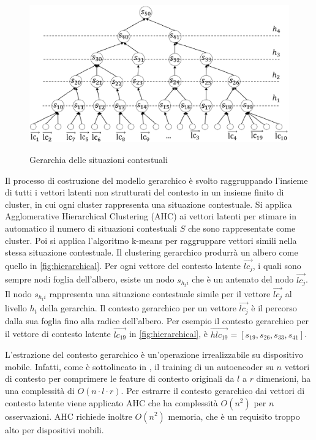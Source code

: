 \documentclass[12pt,italian]{report}
\begin{document}
\begin{figure}
 \centering
  \includegraphics[scale=0.70]{immagini/hierarchical.png}
  \caption{Gerarchia delle situazioni contestuali}
  \label{fig:hierarchical}
  \cite{hierarchical-context}
\end{figure}

Il processo di costruzione del modello gerarchico è svolto raggruppando l'insieme di tutti i vettori latenti non strutturati del contesto in un insieme finito di cluster, in cui ogni cluster rappresenta una situazione contestuale. Si applica Agglomerative Hierarchical Clustering (AHC) \cite{AHC} ai vettori latenti per stimare in automatico il numero di situazioni contestuali $S$ che sono rappresentate come cluster. Poi si applica l'algoritmo k-means  per raggruppare vettori simili nella stessa situazione contestuale. Il clustering gerarchico produrrà un albero come quello in \autoref{fig:hierarchical}. Per ogni vettore del contesto latente $\overrightarrow{lc_j}$, i quali sono sempre nodi foglia dell'albero, esiste un nodo $s_{h_ti}$ che è un antenato del nodo $\overrightarrow{lc_j}$. Il nodo $s_{h_ti}$ rappresenta una situazione contestuale simile per il vettore $\overrightarrow{lc_j}$ al livello $h_t$ della gerarchia. Il contesto gerarchico per un vettore $\overrightarrow{lc_j}$ è il percorso dalla sua foglia fino alla radice dell'albero. Per esempio il contesto gerarchico per il vettore di contesto latente $\overrightarrow{lc_{19}}$ in \autoref{fig:hierarchical}, è $\overrightarrow{hlc_{19}} = [s_{19}, s_{26}, s_{33}, s_{41}]$.

L'estrazione del contesto gerarchico è un'operazione irrealizzabile su dispositivo mobile. Infatti, come è sottolineato in \cite{hierarchical-context}, il training di un autoencoder su $n$ vettori di contesto per comprimere le feature di contesto originali da $l$ a $r$ dimensioni, ha una complessità di $O(n \cdot l \cdot r)$. Per estrarre il contesto gerarchico dai vettori di contesto latente viene applicato AHC che ha complessità $O(n^2)$ per $n$ osservazioni. AHC richiede inoltre $O(n^2)$ memoria, che è un requisito troppo alto per dispositivi mobili. 
\end{document}
